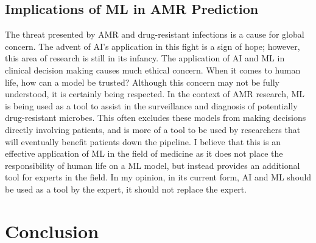 \documentclass[a4paper]{article}
\begin{document}
\subsection{Implications of ML in AMR Prediction}

The threat presented by AMR and drug-resistant infections is a cause for global concern. The advent of AI's application in this fight is a sign of hope; however, this area of research is still in its infancy. The application of AI and ML in clinical decision making causes much ethical concern. When it comes to human life, how can a model be trusted? Although this concern may not be fully understood, it is certainly being respected. In the context of AMR research, ML is being used as a tool to assist in the surveillance and diagnosis of potentially drug-resistant microbes. This often excludes these models from making decisions directly involving patients, and is more of a tool to be used by researchers that will eventually benefit patients down the pipeline. I believe that this is an effective application of ML in the field of medicine as it does not place the responsibility of human life on a ML model, but instead provides an additional tool for experts in the field. In my opinion, in its current form, AI and ML should be used as a tool by the expert, it should not replace the expert. 

\section{Conclusion}
\end{document}

